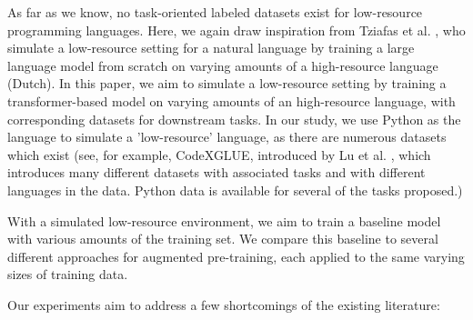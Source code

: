 \documentclass[acmlarge]{acmart}
\begin{document}
As far as we know, no task-oriented labeled datasets exist for low-resource programming languages. Here, we again draw inspiration from Tziafas et al. \cite{Tziafas}, who simulate a low-resource setting for a natural language by training a large language model from scratch on varying amounts of a high-resource language (Dutch). In this paper, we aim to simulate a low-resource setting by training a transformer-based model on varying amounts of an high-resource language, with corresponding datasets for downstream tasks. In our study, we use Python as the language to simulate a 'low-resource' language, as there are numerous datasets which exist (see, for example, CodeXGLUE, introduced by Lu et al. \cite{CodeXGlUE}, which introduces many different datasets with associated tasks and with different languages in the data. Python data is available for several of the tasks proposed.)

With a simulated low-resource environment, we aim to train a baseline model with various amounts of the training set. We compare this baseline to several different approaches for augmented pre-training, each applied to the same varying sizes of training data.

Our experiments aim to address a few shortcomings of the existing literature:
\end{document}
